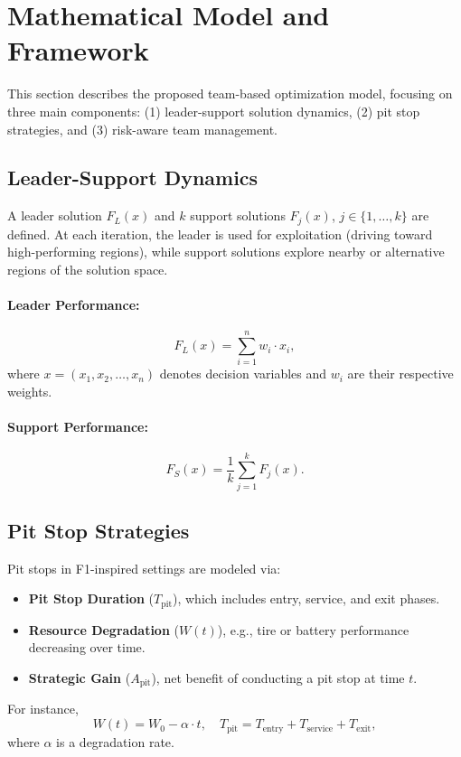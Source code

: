 \documentclass[preprint,12pt]{elsarticle}
\begin{document}
\section{Mathematical Model and Framework}
\label{sec:model}

This section describes the proposed team-based optimization model, focusing on three main components: (1) leader-support solution dynamics, (2) pit stop strategies, and (3) risk-aware team management.

\subsection{Leader-Support Dynamics}
A leader solution $F_L(x)$ and $k$ support solutions $F_j(x)$, $j \in \{1,\dots,k\}$ are defined. At each iteration, the leader is used for exploitation (driving toward high-performing regions), while support solutions explore nearby or alternative regions of the solution space.

\paragraph{Leader Performance:}
\begin{equation}
F_L(x) = \sum_{i=1}^{n} w_i \cdot x_i,
\label{eq:leader}
\end{equation}
where $x = (x_1, x_2, \ldots, x_n)$ denotes decision variables and $w_i$ are their respective weights.

\paragraph{Support Performance:}
\begin{equation}
F_S(x) = \frac{1}{k} \sum_{j=1}^{k} F_j(x).
\label{eq:support}
\end{equation}

\subsection{Pit Stop Strategies}
Pit stops in F1-inspired settings are modeled via:
\begin{itemize}
    \item \textbf{Pit Stop Duration} ($T_{\mathrm{pit}}$), which includes entry, service, and exit phases.
    \item \textbf{Resource Degradation} ($W(t)$), e.g., tire or battery performance decreasing over time.
    \item \textbf{Strategic Gain} ($A_{\mathrm{pit}}$), net benefit of conducting a pit stop at time $t$.
\end{itemize}
For instance,
\begin{equation}
W(t) = W_0 - \alpha \cdot t, \quad
T_{\mathrm{pit}} = T_{\mathrm{entry}} + T_{\mathrm{service}} + T_{\mathrm{exit}},
\end{equation}
where $\alpha$ is a degradation rate.
\end{document}

